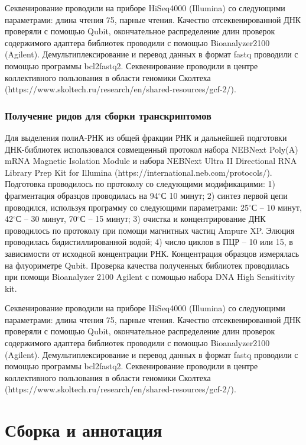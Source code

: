 Секвенирование проводили на приборе HiSeq4000 (Illumina) со следующими параметрами: длина чтения 75, парные чтения. Качество отсеквенированной ДНК проверяли с помощью Qubit, окончательное распределение длин проверок содержимого адаптера библиотек проводили с помощью Bioanalyzer2100 (Agilent). Демультиплексирование и перевод данных в формат fastq проводили с помощью программы bcl2fastq2. Секвенирование проводили в центре коллективного пользования в области геномики Сколтеха (https://www.skoltech.ru/research/en/shared-resources/gcf-2/).


\subsubsection{Получение ридов для сборки транскриптомов}

Для выделения полиА-РНК из общей фракции РНК и дальнейшей подготовки ДНК-библиотек использовался совмещенный протокол набора NEBNext Poly(A) mRNA Magnetic Isolation Module и набора NEBNext Ultra II Directional RNA Library Prep Kit for Illumina (https://international.neb.com/protocols/). Подготовка проводилось по протоколу со следующими модификациями: 
1) фрагментация образцов проводилась на 94$^\circ$С 10 минут; 
2) синтез первой цепи проводился, используя программу со следующими параметрами: 25$^\circ$С -- 10 минут, 42$^\circ$С -- 30 минут, 70$^\circ$С -- 15 минут; 
3) очистка и концентрирование ДНК проводилось по протоколу при помощи магнитных частиц Ampure XP. Элюция проводилась бидистиллированной водой; 
4) число циклов в ПЦР -- 10 или 15, в зависимости от исходной концентрации РНК. 
Концентрация образцов измерялась на флуориметре Qubit. Проверка качества полученных библиотек проводилась при помощи Bioanalyzer 2100 Agilent с помощью набора DNA High Sensitivity kit. 

Секвенирование проводили на приборе HiSeq4000 (Illumina) со следующими параметрами: длина чтения 75, парные чтения. Качество отсеквенированной ДНК проверяли с помощью Qubit, окончательное распределение длин проверок содержимого адаптера библиотек проводили с помощью Bioanalyzer2100 (Agilent). Демультиплексирование и перевод данных в формат fastq проводили с помощью программы bcl2fastq2. Секвенирование проводили в центре коллективного пользования в области геномики Сколтеха (https://www.skoltech.ru/research/en/shared-resources/gcf-2/).

\section{Сборка и аннотация}

